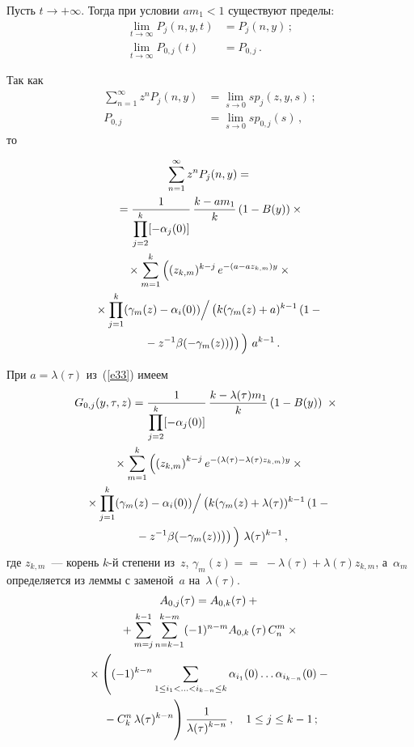 \begin{multicols}{2}
 Пусть $t\rightarrow+\infty.$ Тогда при условии $a m_1<1$
существуют пределы:
\begin{align*}
\lim\limits_{t\rightarrow\infty}P_{j}(n,y,t)&=P_{j}(n,y)\,;\\
\lim\limits_{t\rightarrow\infty}P_{0,j}(t)&=P_{0,j}\,.
\end{align*}

Так как
\begin{align*}
\sum_{n=1}^{\infty}z^{n}P_{j}(n,y)&=\lim\limits_{s\rightarrow0}sp_{j}(z,y,s)\,;\\
P_{0,j}&=\lim\limits_{s\rightarrow0}sp_{0,j}(s)\,,
\end{align*}
то

\noindent
\begin{multline}
\sum^{\infty}_{n=1}z^{n}P_{j}(n,y)={}\\
{}=
\fr{1}{\prod\limits_{j=2}^{k}[-\alpha_{j}(0)]}\,\fr{k-am_{1}}{k}\left(1-B(y)\right)\times{}\\
{}\times \sum_{m=1}^{k}
\left (
(z_{k,m})^{k-j}\,
e^{-(a-az_{k,m})y}\times{}\right.\\
{}\times\prod\limits_{j=1}^{k}(\gamma_{m}(z)-\alpha_{i}(0))\Big / %
\left (k(\gamma_{m}(z)+a)^{k-1}\left(1-{}\right.\right.\\
\left.\left.\left.{}- z^{-1}
\beta(-\gamma_{m}(z))\right)\right )
\vphantom{\left(z_{k,m}\right)^{k-j}}\right )\, a^{k-1}\,.
\label{e33}
\end{multline}


При  $a=\lambda(\tau)$ из~(\ref{e33}) имеем
\begin{multline*}
\!\!\!G_{0,j}(y,\tau,z)=
\fr{1}{\prod\limits_{j=2}^{k}[-\alpha_{j}(0)]}\,\fr{k-\lambda(\tau)m_{1}}{k}\,
(1-B(y))\;\times{}\\ 
{}\times\sum\limits_{m=1}^{k}
\left (\left(z_{k,m}\right)^{k-j}
e^{-(\lambda(\tau)-\lambda(\tau)z_{k,m})y}\times{}\right.\\
{}\times
\prod\limits_{j=1}^{k}(\gamma_{m}(z)-\alpha_{i}(0))\Big /
\left (k(\gamma_{m}(z)+\lambda(\tau))^{k-1}\left(1-{}\right.\right.\\
\left.\left.\left.{}- z^{-1}
\beta(-\gamma_{m}(z))\right )\right)
\vphantom{\left(z_{k,m}\right)^{k-j}}
\right)\,\lambda(\tau)^{k-1}\,,
\end{multline*}
где $z_{k,m}$~--- корень $k$-й степени из~$z$,
$\gamma_{m}(z)=$\linebreak $=\;-\lambda(\tau)+\lambda(\tau)z_{k,m}$, а~$\alpha_{m}$
определяется из леммы с заменой~$a$ на~$\lambda(\tau)$.
\begin{multline*}
A_{0,j}(\tau)=A_{0,k}(\tau)+{}\\
{}+
\sum_{m=j}^{k-1}\sum_{n=k-1}^{k-m}(-1)^{n-m}A_{0,k}\left(\tau\right)C_{n}^{m}\times{}
\\
{} \times\left((-1)^{k-n}\sum_{1\leq i_{1}<\ldots<i_{k-n}\leq
k}\alpha_{i_{1}}(0)\ldots\alpha_{i_{k-n}}(0)-{}\right.\\
\left.{}-C_{k}^{n}\,\lambda(\tau)^{k-n}
\vphantom{\sum_{1\leq i_{1}<\ldots<i_{k-n}\leq
k}}
\right)
\fr{1}{\lambda(\tau)^{k-n}}\,,\quad  1\leq j \leq k-1\,;
\end{multline*}


\end{multicols}
